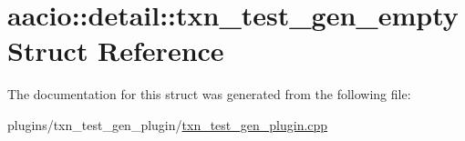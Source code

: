\hypertarget{structaacio_1_1detail_1_1txn__test__gen__empty}{}\section{aacio\+:\+:detail\+:\+:txn\+\_\+test\+\_\+gen\+\_\+empty Struct Reference}
\label{structaacio_1_1detail_1_1txn__test__gen__empty}


The documentation for this struct was generated from the following file\+:\begin{DoxyCompactItemize}
\item 
plugins/txn\+\_\+test\+\_\+gen\+\_\+plugin/\mbox{\hyperlink{txn__test__gen__plugin_8cpp}{txn\+\_\+test\+\_\+gen\+\_\+plugin.\+cpp}}\end{DoxyCompactItemize}
